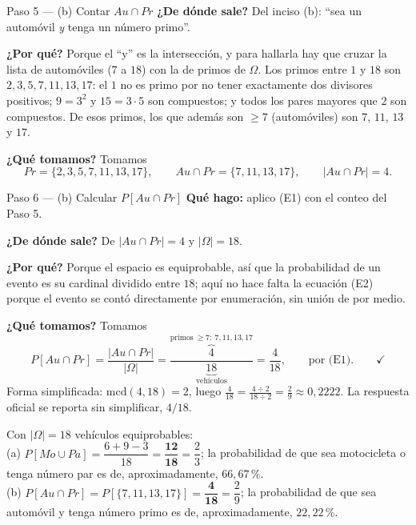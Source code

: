 \documentclass[11pt]{article}
\begin{document}
\begin{sol}
\begin{paso}{Paso 5 --- (b) Contar $Au\cap Pr$}
\textbf{¿De dónde sale?} Del inciso (b): ``sea un automóvil \emph{y} tenga un número primo''.

\textbf{¿Por qué?} Porque el ``y'' es la intersección, y para hallarla hay que cruzar la lista
de automóviles ($7$ a $18$) con la de primos de $\Omega$. Los primos entre $1$ y $18$ son
$2,3,5,7,11,13,17$: el $1$ no es primo por no tener exactamente dos divisores positivos;
$9=3^{2}$ y $15=3\cdot 5$ son compuestos; y todos los pares mayores que $2$ son compuestos. De
esos primos, los que además son $\ge 7$ (automóviles) son $7$, $11$, $13$ y $17$.

\textbf{¿Qué tomamos?} Tomamos
\[
Pr=\{2,3,5,7,11,13,17\},\qquad
Au\cap Pr=\{7,11,13,17\},\qquad |Au\cap Pr|=4 .
\]
\end{paso}

\begin{paso}{Paso 6 --- (b) Calcular $P[Au\cap Pr]$}
\textbf{Qué hago:} aplico (E1) con el conteo del Paso 5.

\textbf{¿De dónde sale?} De $|Au\cap Pr|=4$ y $|\Omega|=18$.

\textbf{¿Por qué?} Porque el espacio es equiprobable, así que la probabilidad de un evento es su
cardinal dividido entre $18$; aquí no hace falta la ecuación (E2) porque el evento se contó
directamente por enumeración, sin unión de por medio.

\textbf{¿Qué tomamos?} Tomamos
\[
P[Au\cap Pr]=\frac{|Au\cap Pr|}{|\Omega|}
=\frac{\overbrace{4}^{\text{primos}\ \ge 7:\ 7,11,13,17}}{\underbrace{18}_{\text{vehículos}}}
=\frac{4}{18} , \qquad\text{por (E1)} . \qquad\checkmark
\]
Forma simplificada: $\mathrm{mcd}(4,18)=2$, luego
$\frac{4}{18}=\frac{4\div 2}{18\div 2}=\frac{2}{9}\approx 0{,}2222$. La respuesta oficial se
reporta sin simplificar, $4/18$.
\end{paso}

\end{sol}

\begin{resp}
Con $|\Omega|=18$ vehículos equiprobables:\\[4pt]
(a) $P[Mo\cup Pa]=\dfrac{6+9-3}{18}=\mathbf{\dfrac{12}{18}}=\dfrac{2}{3}$; la probabilidad de que
sea motocicleta o tenga número par es de, aproximadamente, $66{,}67$\,\%.\\[4pt]
(b) $P[Au\cap Pr]=P[\{7,11,13,17\}]=\mathbf{\dfrac{4}{18}}=\dfrac{2}{9}$; la probabilidad de que
sea automóvil y tenga número primo es de, aproximadamente, $22{,}22$\,\%.
\end{resp}
\end{document}
